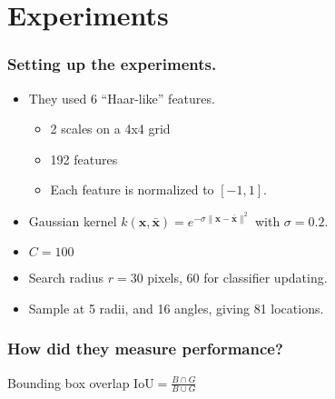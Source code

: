 \section{Experiments}

\begin{frame}
    \frametitle{Setting up the experiments.}
    \begin{itemize}
        \item They used 6 ``Haar-like'' features.
            \begin{itemize}
                \item 2 scales on a 4x4 grid
                \item 192 features
                \item Each feature is normalized to $[-1, 1]$.
            \end{itemize}
        \item Gaussian kernel \( k(\mathbf{x}, \mathbf{\bar{x}}) = e^{-\sigma\|\mathbf{x} -
            \mathbf{\bar{x}}\|^2} \) with \( \sigma = 0.2 \).
        \item \( C = 100 \)
        \item Search radius \( r = 30 \) pixels, \(60\) for classifier updating.
        \item Sample at 5 radii, and 16 angles, giving 81 locations.
    \end{itemize}
\end{frame}

\begin{frame}
    \frametitle{How did they measure performance?}
    \begin{block}{Bounding box overlap}
        $\text{IoU} = \frac{B \cap G}{B \cup G}$
    \end{block}
\end{frame}

